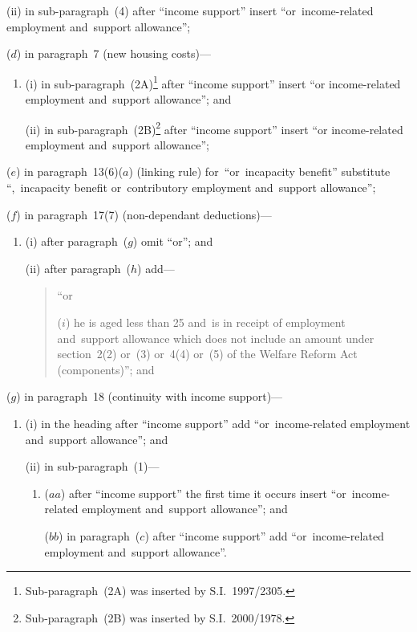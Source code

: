 \documentclass[12pt,a4paper]{article}
\begin{document}
\begin{enumerate}
\begin{enumerate}
(ii) in sub-paragraph~(4) after “income support” insert “or~income-related employment and~support allowance”;
\end{enumerate}

($d$) in paragraph~7 (new housing costs)—
\begin{enumerate}\item[]
(i) in sub-paragraph~(2A)\footnote{Sub-paragraph~(2A) was inserted by S.I.~1997/2305.} after “income support” insert “or income-related employment and~support allowance”; and

(ii) in sub-paragraph~(2B)\footnote{Sub-paragraph~(2B) was inserted by S.I.~2000/1978.} after “income support” insert “or income-related employment and~support allowance”;
\end{enumerate}

($e$) in paragraph~13(6)($a$)  (linking rule) for~“or~incapacity benefit” substitute “,~incapacity benefit or~contributory employment and~support allowance”;

($f$) in paragraph~17(7) (non-dependant deductions)—
\begin{enumerate}\item[]
(i) after paragraph~($g$)  omit “or”; and

(ii) after paragraph~($h$)  add—
\begin{quotation}
“or

($i$) he is aged less than 25 and~is in receipt of employment and~support allowance which does not include an amount under section~2(2) or~(3) or~4(4) or~(5) of the Welfare Reform Act (components)”; and
\end{quotation}
\end{enumerate}

($g$) in paragraph~18 (continuity with income support)—
\begin{enumerate}\item[]
(i) in the heading after “income support” add “or~income-related employment and~support allowance”; and

(ii) in sub-paragraph~(1)—
\begin{enumerate}\item[]
($aa$) after “income support” the first time it occurs insert “or~income-related employment and~support allowance”; and

($bb$) in paragraph~($c$)  after “income support” add “or~income-related employment and~support allowance”.
\end{enumerate}
\end{enumerate}
\end{enumerate}
\end{document}
